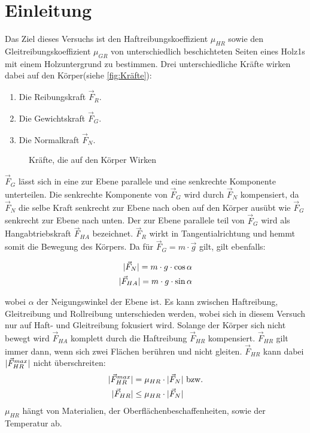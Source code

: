 \section{Einleitung}

Das Ziel dieses Versuchs ist den Haftreibungskoeffizient $\mu_{HR}$ sowie den Gleitreibungskoeffizient $\mu_{GR}$ von unterschiedlich beschichteten Seiten eines Holz1s mit einem Holzuntergrund zu bestimmen.
\newline
Drei unterschiedliche Kräfte wirken dabei auf den Körper(siehe \autoref{fig:Kräfte}):
\begin{enumerate}
    \item Die Reibungskraft $\vec{F}_R$.
    \item Die Gewichtskraft $\vec{F}_G$.
    \item Die Normalkraft $\vec{F}_N$.
\end{enumerate}


\usetikzlibrary{angles,quotes}
\begin{figure}
    \centering 
    
    \caption[Kräfte]{Kräfte, die auf den Körper Wirken}
    \label{fig:Kräfte}
\end{figure}

$\vec{F}_G$ lässt sich in eine zur Ebene parallele und eine senkrechte Komponente unterteilen. Die senkrechte Komponente von $\vec{F}_G$ wird durch $\vec{F}_N$ kompensiert, da $\vec{F}_N$ die selbe Kraft senkrecht zur Ebene nach oben auf den Körper ausübt wie $\vec{F}_G$ senkrecht zur Ebene nach unten. Der zur Ebene parallele teil von $\vec{F}_G$ wird als Hangabtriebskraft $\vec{F}_{HA}$ bezeichnet. $\vec{F}_R$ wirkt in Tangentialrichtung und hemmt somit die Bewegung des Körpers.\newline
Da für $\vec{F}_{G} = m \cdot \vec{g}$ gilt, gilt ebenfalls:

\begin{align}
    \lvert\vec{F}_{N}\rvert = m \cdot g \cdot \cos{\alpha} \label{eq:F_N} \\
    \lvert\vec{F}_{HA}\rvert = m \cdot g \cdot \sin{\alpha} \label{eq:F_HA}
\end{align}

wobei $\alpha$ der Neigungswinkel der Ebene ist.
Es kann zwischen Haftreibung, Gleitreibung und Rollreibung unterschieden werden, wobei sich in diesem Versuch nur auf Haft- und Gleitreibung fokusiert wird.
\newline
Solange der Körper sich nicht bewegt wird $\vec{F}_{HA}$ komplett durch die Haftreibung $\vec{F}_{HR}$ kompensiert. $\vec{F}_{HR}$ gilt immer dann, wenn sich zwei Flächen berühren und nicht gleiten. $\vec{F}_{HR}$ kann dabei $\lvert\vec{F}_{HR}^{max}\rvert$ nicht überschreiten:
\begin{subequations}
    \begin{align}
        \lvert\vec{F}_{HR}^{max}\rvert &= \mu_{HR} \cdot \lvert\vec{F}_{N}\rvert \text{ bzw.}\\
        \lvert\vec{F}_{HR}\rvert &\leq \mu_{HR} \cdot \lvert\vec{F}_{N}\rvert
    \end{align}
    \label{eq:F_HR}
\end{subequations}
$\mu_{HR}$ hängt von Materialien, der Oberflächenbeschaffenheiten, sowie der Temperatur ab. \newline

